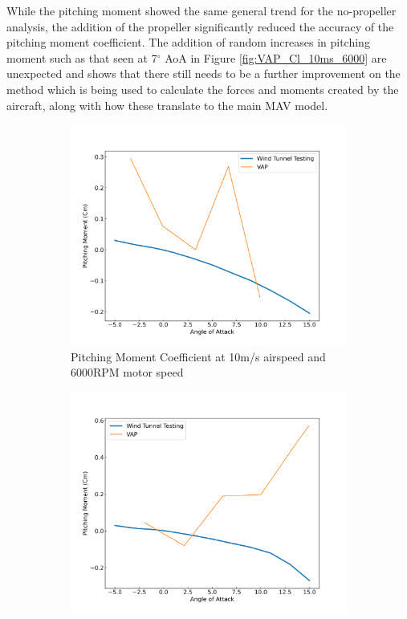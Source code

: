 While the pitching moment showed the same general trend for the no-propeller analysis, the addition of the propeller significantly reduced the accuracy of the pitching moment coefficient. The addition of random increases in pitching moment such as that seen at 7$^\circ$ \acrshort{AoA} in Figure \ref{fig:VAP_Cl_10ms_6000} are unexpected and shows that there still needs to be a further improvement on the method which is being used to calculate the forces and moments created by the aircraft, along with how these translate to the main \acrshort{MAV} model. 

\begin{figure}[H]
    \centering
    \begin{subfigure}[b]{0.467\textwidth}
        \centering
        \includegraphics[width=\textwidth]{05_Results/VAP/tractor/Cm/10ms_6000RPM_Cm.png}
        \caption{Pitching Moment Coefficient at 10m/s airspeed and 6000RPM motor speed}
        \label{fig:VAP_Cm_10ms_6000}
    \end{subfigure}
    \begin{subfigure}[b]{0.467\textwidth}
        \centering
        \includegraphics[width=\textwidth]{05_Results/VAP/tractor/Cm/10ms_11000RPM_Cm.png}

\end{subfigure}
\end{figure}

